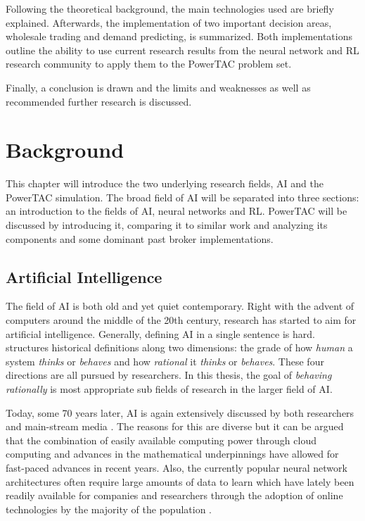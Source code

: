 Following the theoretical background, the main technologies used are briefly explained. Afterwards, the implementation of two
important decision areas, wholesale trading and demand predicting, is summarized. Both implementations outline the
ability to use current research results from the neural network and \ac{RL} research community to apply them to the
\ac{PowerTAC} problem set.

Finally, a conclusion is drawn and the limits and weaknesses as well as recommended further research is discussed.

\chapter{Background}
\label{cha:background}

This chapter will introduce the two underlying research fields, \ac{AI} and the \ac{PowerTAC} simulation. The broad
field of \ac{AI} will be separated into three sections: an introduction to the fields of \ac{AI}, neural networks and \ac{RL}. 
\ac{PowerTAC} will be discussed by introducing it, comparing it to similar work and analyzing its
components and some dominant past broker implementations.

\section{Artificial Intelligence}%
\label{sec:artificial_intelligence}


The field of \ac{AI} is both old and yet quiet contemporary.
Right with the advent of computers around the middle of the 20th century, research has started to aim for artificial
intelligence. Generally, defining \ac{AI} in a single sentence is hard. \citet{russell2016artificial} structures
historical definitions along two dimensions: the grade of how \emph{human} a system \emph{thinks} or \emph{behaves}
and how \emph{rational} it \emph{thinks} or \emph{behaves}. These four directions are all pursued by researchers. In
this thesis, the goal of \emph{behaving rationally} is most appropriate sub fields of research in the larger field of
\ac{AI}.

Today, some 70 years later, \ac{AI} is again extensively discussed by both researchers and main-stream media
\citep[p.24ff.]{russell2016artificial, arulkumaran2017brief}. The reasons for this are diverse but it can be argued that
the combination of easily available computing power through cloud computing and advances in the mathematical
underpinnings have allowed for fast-paced advances in recent years. Also, the currently popular neural network 
architectures often require large amounts of data to learn which have lately been readily available for companies and
researchers through the adoption of online technologies by the majority of the population
\citep[p.27]{russell2016artificial}.

